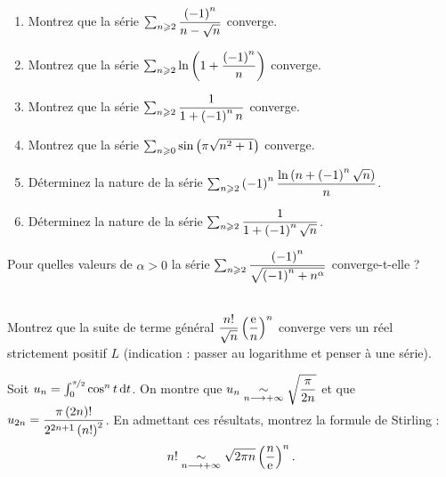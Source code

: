 \begin{corr}
\end{corr}

\begin{exoss}~\\
\begin{enumerate}
    \item Montrez que la série \(\sum_{n\geqslant2}\dfrac{\left(-1\right)^n}{n-\sqrt{n}}\) converge. \\
    \item Montrez que la série \(\sum_{n\geqslant2}\ln\left(1+\dfrac{\left(-1\right)^n}{n}\right)\) converge. \\
    \item Montrez que la série \(\sum_{n\geqslant2}\dfrac{1}{1+\left(-1\right)^nn}\) converge. \\
    \item Montrez que la série \(\sum_{n\geqslant0}\sin\left(\pi\sqrt{n^2+1}\right)\) converge. \\
    \item Déterminez la nature de la série \(\sum_{n\geqslant2}\left(-1\right)^n\dfrac{\ln\left(n+\left(-1\right)^n\sqrt{n}\right)}{n}\). \\
    \item Déterminez la nature de la série \(\sum_{n\geqslant2}\dfrac{1}{1+\left(-1\right)^n\sqrt{n}}\).
\end{enumerate}
\end{exoss}

\begin{corr}
\end{corr}

\begin{exoss}[Exercice 11]
Pour quelles valeurs de \(\alpha>0\) la série \(\sum_{n\geqslant2}\dfrac{\left(-1\right)^n}{\sqrt{\left(-1\right)^n+n^\alpha}}\) converge-t-elle ?
\end{exoss}

\begin{corr}
\end{corr}

\begin{exoss}~\\
Montrez que la suite de terme général \(\dfrac{n!}{\sqrt{n}}\left(\dfrac{\mathrm{e}^{}}{n}\right)^n\) converge vers un réel strictement positif \(L\) (indication : passer au logarithme et penser à une série).

Soit \(u_n=\int_0^{\nicefrac{\pi}{2}}\cos^nt\odif{t}\). On montre que \(u_n\underset{n\longrightarrow+\infty}{\sim}\sqrt{\dfrac{\pi}{2n}}\) et que \(u_{2n}=\dfrac{\pi\left(2n\right)!}{2^{2n+1}\left(n!\right)^2}\). En admettant ces résultats, montrez la formule de Stirling : \[n!\underset{n\longrightarrow+\infty}{\sim}\sqrt{2\pi n}\left(\dfrac{n}{\mathrm{e}^{}}\right)^n.\]
\end{exoss}

